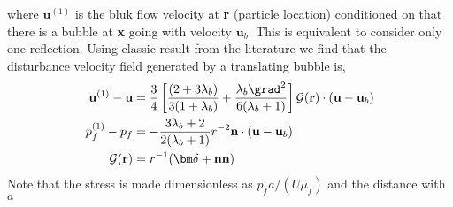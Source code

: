 where $\textbf{u}^{(1)}$ is the bluk flow velocity at \textbf{r} (particle location) conditioned on that there is a bubble at \textbf{x} going with velocity $\textbf{u}_b$. 
This is equivalent to consider only one reflection. 
Using classic result from the literature we find that the disturbance velocity field generated by a translating bubble is, 
\begin{align*}
    \textbf{u}^{(1)} - \textbf{u}
    &=
    \frac{3}{4}\left[
        \frac{(2+3\lambda_b)}{3(1+\lambda_b)}
        + 
        \frac{\lambda_b\grad^2}{6(\lambda_b+1)}
        \right]\mathcal{G}(\textbf{r})\cdot
    (\textbf{u}- \textbf{u}_b)\\
    p_f^{(1)} - p_f
    &=
    -\frac{3\lambda_b+2}{2(\lambda_b+1)}r^{-2} \textbf{n}\cdot (\textbf{u}- \textbf{u}_b)\\
    \mathcal{G}(\textbf{r})
    &=
    r^{-1}(\bm\delta + \textbf{nn})
\end{align*}
Note that the stress is made dimensionless as $p_f  a / (U \mu_f)$ and the distance with $a$


